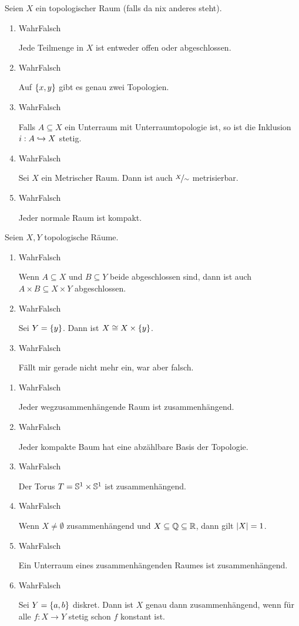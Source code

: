 \documentclass{../../../Template/TemplateExercise}
\newif\ifprintanswers
\newcommand*{\TrueFalse}[1]{%
\ifprintanswers
    \ifthenelse{\equal{#1}{W}}{%
        \textbf{WAHR}\hspace*{14pt}Falsch
    }{
        Wahr\hspace*{14pt}\textbf{FALSCH}
    }
\else
    {Wahr}\hspace*{14pt}Falsch 
\fi
}
\newlength\TFlengthA
\newlength\TFlengthB
\newcommand\TFQuestion[2]{%
    \setlength\TFlengthB{\linewidth}
    \addtolength\TFlengthB{-\TFlengthA}
    \parbox[t]{\TFlengthA}{\TrueFalse{#1}}\parbox[t]{\TFlengthB}{#2}}
\begin{document}
Seien $X$ ein topologischer Raum (falls da nix anderes steht).
\begin{enumerate}
    \item \TFQuestion{F}{Jede Teilmenge in $X$ ist entweder offen oder abgeschlossen.}
    \item \TFQuestion{F}{Auf $\{x,y\}$ gibt es genau zwei Topologien.}
    \item \TFQuestion{W}{Falls $A \subseteq X$ ein Unterraum mit Unterraumtopologie ist, so ist die Inklusion $i: A \hookrightarrow X$ stetig.}
    \item \TFQuestion{F}{Sei $X$ ein Metrischer Raum. Dann ist auch $\nicefrac{X}{\sim}$ metrisierbar.}
    \item \TFQuestion{F}{Jeder normale Raum ist kompakt.}
\end{enumerate}

Seien $X, Y$ topologische Räume.
\begin{enumerate}
    \item \TFQuestion{W}{Wenn $A \subseteq X$ und $B \subseteq Y$ beide abgeschlossen sind, dann ist auch $A \times B \subseteq X \times Y$ abgeschlossen.}
    \item \TFQuestion{W}{Sei $Y = \{y\}$. Dann ist $X \cong X \times \{y\}$.}
    \item \TFQuestion{F}{Fällt mir gerade nicht mehr ein, war aber falsch.}
\end{enumerate}


\begin{enumerate}
    \item \TFQuestion{W}{Jeder wegzusammenhängende Raum ist zusammenhängend.}
    \item \TFQuestion{F}{Jeder kompakte Baum hat eine abzählbare Basis der Topologie.}
    \item \TFQuestion{W}{Der Torus $T = \mathbb{S}^1 \times \mathbb{S}^1$ ist zusammenhängend.}
    \item \TFQuestion{W}{Wenn $X \neq \emptyset$ zusammenhängend und $X \subseteq \mathbb{Q} \subseteq \mathbb{R}$, dann gilt $\lvert X\rvert = 1$.}
    \item \TFQuestion{F}{Ein Unterraum eines zusammenhängenden Raumes ist zusammenhängend.}
    \item \TFQuestion{W}{Sei $Y = \{a,b\}$ diskret. Dann ist $X$ genau dann zusammenhängend, wenn für alle $f: X \to Y$ stetig schon $f$ konstant ist.}
\end{enumerate}
\end{document}
